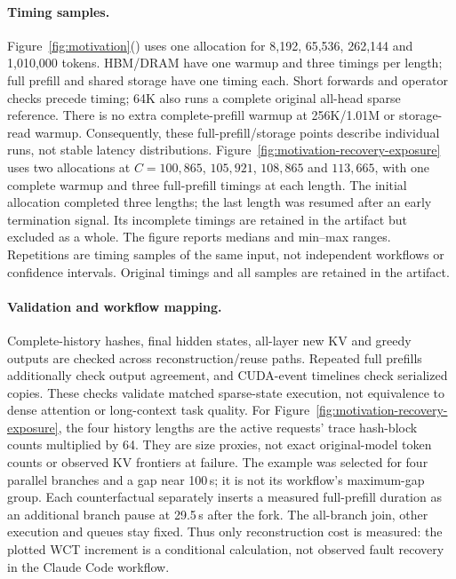 \paragraph{Timing samples.}
Figure~\ref{fig:motivation}() uses one
allocation for 8,192, 65,536, 262,144 and 1,010,000 tokens. HBM/DRAM have
one warmup and three timings per length; full prefill and shared storage
have one timing each. Short forwards and operator checks precede timing;
64K also runs a complete original all-head sparse reference. There is
no extra complete-prefill warmup at 256K/1.01M or storage-read warmup.
Consequently, these full-prefill/storage points describe individual
runs, not stable latency distributions.
Figure~\ref{fig:motivation-recovery-exposure} uses two allocations at
$C=100{,}865$, $105{,}921$, $108{,}865$ and $113{,}665$, with one complete
warmup and three full-prefill timings at each length. The initial allocation completed three lengths; the last length was
resumed after an early termination signal. Its incomplete timings are
retained in the artifact but excluded as a whole. The figure reports
medians and min--max ranges. Repetitions are timing samples of the same input,
not independent workflows or confidence intervals. Original timings and
all samples are retained in the artifact.

\paragraph{Validation and workflow mapping.}
Complete-history hashes, final hidden states, all-layer new KV and greedy
outputs are checked across reconstruction/reuse paths. Repeated full
prefills additionally check output agreement, and CUDA-event timelines
check serialized copies. These checks validate matched sparse-state
execution, not equivalence to dense attention or long-context task quality.
For Figure~\ref{fig:motivation-recovery-exposure}, the four history lengths
are the active requests' trace hash-block counts multiplied by 64.
They are size proxies, not exact original-model token counts or observed
KV frontiers at failure. The example was selected for four parallel
branches and a gap near 100\,s; it is not its workflow's maximum-gap group.
Each counterfactual separately inserts a measured full-prefill duration
as an additional branch pause at 29.5\,s after the fork. The all-branch
join, other execution and queues stay fixed. Thus only reconstruction
cost is measured: the plotted WCT increment is a conditional calculation,
not observed fault recovery in the Claude Code workflow.

